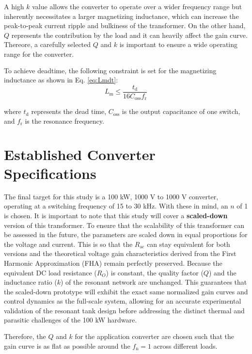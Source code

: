 A high $k$ value allows the converter to operate over a wider frequency range but inherently necessitates a larger magnetizing inductance, which can increase the peak-to-peak current ripple and bulkiness of the transformer. On the other hand, $Q$ represents the contribution by the load and it can heavily affect the gain curve. Thereore, a carefully selected $Q$ and $k$ is important to ensure a wide operating range for the converter. 

To achieve deadtime, the following constraint is set for the magnetizing inductance \cite{ref19} as shown in Eq. \ref{eq:Lmdt}:
\begin{equation}
L_\mathrm{m} \leq \frac{t_\mathrm{d}}{16C_\mathrm{oss}f_\mathrm{r}}\label{eq:Lmdt}    
\end{equation}

\noindent where $t_\mathrm{d}$ represents the dead time, $C_\mathrm{oss}$ is the output capacitance of one switch, and $f_\mathrm{r}$ is the resonance frequency.

\section{Established Converter Specifications}\label{sec:established}
The final target for this study is a 100 kW, 1000 V to 1000 V converter, operating at a switching frequency of 15 to 30 kHz. With these in mind, an $n$ of 1 is chosen. It is important to note that this study will cover a \textbf{scaled-down} version of this transformer. To ensure that the scalability of this transformer can be assessed in the future, the parameters are scaled down in equal proportions for the voltage and current. This is so that the $R_\mathrm{ac}$ can stay equivalent for both versions and the theoretical voltage gain characteristics derived from the First Harmonic Approximation (FHA) remain perfectly preserved. Because the equivalent DC load resistance ($R_O$) is constant, the quality factor ($Q$) and the inductance ratio ($k$) of the resonant network are unchanged. This guarantees that the scaled-down prototype will exhibit the exact same normalized gain curves and control dynamics as the full-scale system, allowing for an accurate experimental validation of the resonant tank design before addressing the distinct thermal and parasitic challenges of the 100 kW hardware.

Therefore, the $Q$ and $k$ for the application converter are chosen such that the gain curve is as flat as possible around the $f_\mathrm{n} = 1$ across different loads. 

